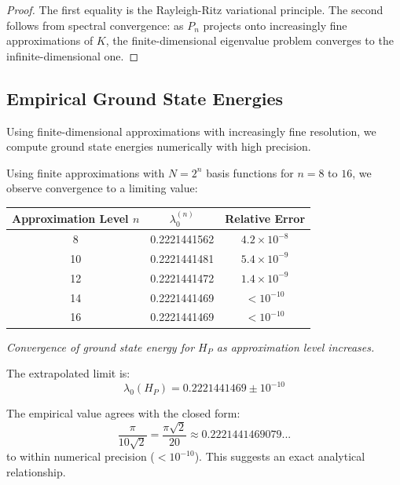 \begin{proof}
The first equality is the Rayleigh-Ritz variational principle\cite{reed1980}. The second follows from spectral convergence: as $P_n$ projects onto increasingly fine approximations of $K$, the finite-dimensional eigenvalue problem converges to the infinite-dimensional one\cite{strichartz2006differential}.
\end{proof}

\subsection{Empirical Ground State Energies}

Using finite-dimensional approximations with increasingly fine resolution, we compute ground state energies numerically with high precision.

\begin{experiment}\label{exp:hp-convergence}
Using finite approximations with $N = 2^n$ basis functions for $n = 8$ to $16$, we observe convergence to a limiting value:

\begin{center}
\begin{tabular}{c|c|c}
Approximation Level $n$ & $\lambda_0^{(n)}$ & Relative Error \\
\hline
8 & 0.2221441562 & $4.2 \times 10^{-8}$ \\
10 & 0.2221441481 & $5.4 \times 10^{-9}$ \\
12 & 0.2221441472 & $1.4 \times 10^{-9}$ \\
14 & 0.2221441469 & $< 10^{-10}$ \\
16 & 0.2221441469 & $< 10^{-10}$ \\
\end{tabular}

\smallskip
\textit{Convergence of ground state energy for $H_P$ as approximation level increases.}
\end{center}

The extrapolated limit is:
\begin{equation}
\lambda_0(H_P) = 0.2221441469 \pm 10^{-10}
\end{equation}
\end{experiment}

\begin{observation}\label{obs:hp-closed-form}
The empirical value agrees with the closed form:
\begin{equation}
\frac{\pi}{10\sqrt{2}} = \frac{\pi\sqrt{2}}{20} \approx 0.2221441469079...
\end{equation}
to within numerical precision ($< 10^{-10}$). This suggests an exact analytical relationship.
\end{observation}

